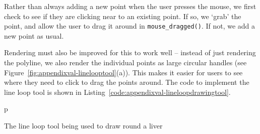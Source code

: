 Rather than always adding a new point when the user presses the mouse, we first check to see if they are clicking near to an existing point. If so, we `grab' the point, and allow the user to drag it around in \texttt{mouse_dragged()}. If not, we add a new point as usual.

Rendering must also be improved for this to work well -- instead of just rendering the polyline, we also render the individual points as large circular handles (see Figure~\ref{fig:appendixval-linelooptool}(a)). This makes it easier for users to see where they need to click to drag the points around. The code to implement the line loop tool is shown in Listing~\ref{code:appendixval-lineloopdrawingtool}.

\begin{stusubfig}{p}
	\hspace{4mm}%
\caption{The line loop tool being used to draw round a liver}
\label{fig:appendixval-linelooptool}
\end{stusubfig}

